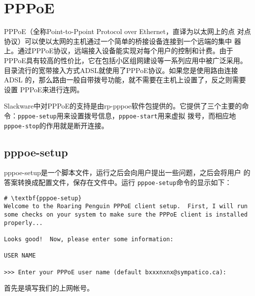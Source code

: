 \section{PPPoE}
\label{sec:networkConfiguration:pppoe}
PPPoE（全称Point-to-Ppoint Protocol over Ethernet，直译为以太网上的点
对点协议）可以使以太网的主机通过一个简单的桥接设备连接到一个远端的集中
器上。通过PPPoE协议，远端接入设备能实现对每个用户的控制和计费。由于
PPPoE具有较高的性价比，它在包括小区组网建设等一系列应用中被广泛采用。
目录流行的宽带接入方式ADSL就使用了PPPoE协议。如果您是使用路由连接ADSL
的，那么路由一般自带拨号功能，就不需要在主机上设置了，反之则需要设置
PPPoE来进行连网。

Slackware中对PPPoE的支持是由rp-pppoe软件包提供的。它提供了三个主要的命
令：\texttt{pppoe-setup}用来设置拨号信息，\texttt{pppoe-start}用来虚拟
拨号，而相应地\texttt{pppoe-stop}的作用就是断开连接。

\subsection{pppoe-setup}
\label{sec:networkConfiguration:pppoe:pppoesetup}

pppoe-setup是一个脚本文件，运行之后会向用户提出一些问题，之后会将用户
的答案转换成配置文件，保存在文件中。运行
\texttt{pppoe-setup}命令的显示如下：
\begin{Verbatim}[frame=single,commandchars=\\\{\}]
# \textbf{pppoe-setup}
Welcome to the Roaring Penguin PPPoE client setup.  First, I will run
some checks on your system to make sure the PPPoE client is installed
properly...

Looks good!  Now, please enter some information:

USER NAME

>>> Enter your PPPoE user name (default bxxxnxnx@sympatico.ca):
\end{Verbatim}
首先是填写我们的上网帐号。

